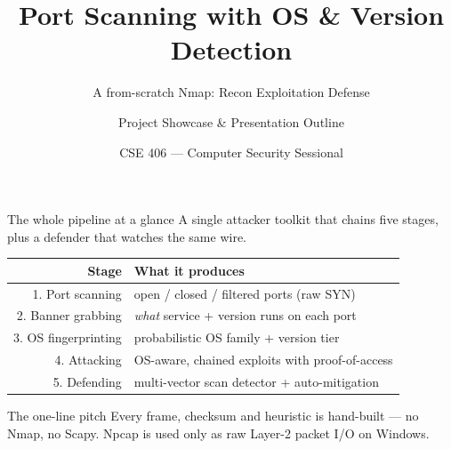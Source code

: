 \documentclass[10pt,aspectratio=169]{beamer}
\title{Port Scanning with OS \& Version Detection}
\subtitle{A from-scratch Nmap: Recon \textrightarrow{} Exploitation \textrightarrow{} Defense}
\date{CSE 406 --- Computer Security Sessional}
\author{Project Showcase \& Presentation Outline}
\institute{Department of CSE, BUET}
\begin{document}
\maketitle

\begin{frame}{The whole pipeline at a glance}
  A single attacker toolkit that chains five stages, plus a defender that
  watches the same wire.
  \begin{center}
  \begin{tabular}{@{}rl@{}}
    \toprule
    \textbf{Stage} & \textbf{What it produces} \\
    \midrule
    1. Port scanning      & open / closed / filtered ports (raw SYN) \\
    2. Banner grabbing    & \emph{what} service + version runs on each port \\
    3. OS fingerprinting  & probabilistic OS family + version tier \\
    4. Attacking          & OS-aware, chained exploits with proof-of-access \\
    5. Defending          & multi-vector scan detector + auto-mitigation \\
    \bottomrule
  \end{tabular}
  \end{center}
  \begin{block}{The one-line pitch}
    Every frame, checksum and heuristic is \alert{hand-built} --- no Nmap, no
    Scapy. Npcap is used only as raw Layer-2 packet I/O on Windows.
  \end{block}
\end{frame}

\end{document}
